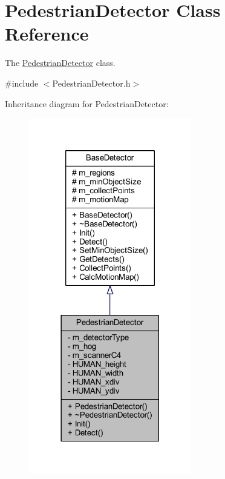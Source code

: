 \hypertarget{class_pedestrian_detector}{}\section{Pedestrian\+Detector Class Reference}
\label{class_pedestrian_detector}


The \mbox{\hyperlink{class_pedestrian_detector}{Pedestrian\+Detector}} class.  




{\ttfamily \#include $<$Pedestrian\+Detector.\+h$>$}



Inheritance diagram for Pedestrian\+Detector\+:\nopagebreak
\begin{figure}[H]
\begin{center}
\leavevmode
\includegraphics[width=201pt]{class_pedestrian_detector__inherit__graph}
\end{center}
\end{figure}


